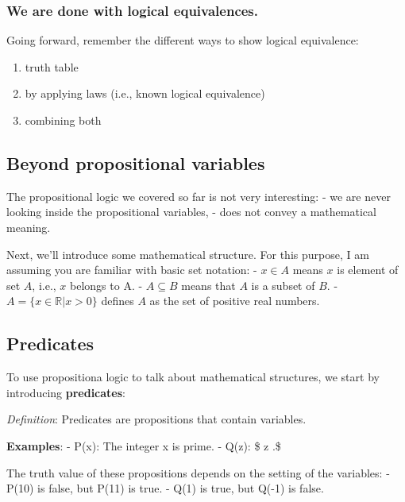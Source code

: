 \documentclass[11pt]{article}
\providecommand{\tightlist}{%
      \setlength{\itemsep}{0pt}\setlength{\parskip}{0pt}}
\begin{document}
    \subsubsection{We are done with logical
equivalences.}\label{we-are-done-with-logical-equivalences.}

Going forward, remember the different ways to show logical equivalence:

\begin{enumerate}
\def\labelenumi{\alph{enumi}.}
\tightlist
\item
  truth table\\
\item
  by applying laws (i.e., known logical equivalence)\\
\item
  combining both
\end{enumerate}

    \subsection{Beyond propositional
variables}\label{beyond-propositional-variables}

The propositional logic we covered so far is not very interesting: - we
are never looking inside the propositional variables, - does not convey
a mathematical meaning.

Next, we'll introduce some mathematical structure. For this purpose, I
am assuming you are familiar with basic set notation: - \(x \in A\)
means \(x\) is element of set \(A\), i.e., \(x\) belongs to A. -
\(A \subseteq B\) means that \(A\) is a subset of \(B.\) -
\(A = \{ x \in \mathbb{R} | x > 0\}\) defines \(A\) as the set of
positive real numbers.

    \subsection{Predicates}\label{predicates}

To use propositiona logic to talk about mathematical structures, we
start by introducing \textbf{predicates}:

\emph{Definition}: Predicates are propositions that contain variables.

\textbf{Examples}: - P(x): The integer x is prime. - Q(z): \$ z
.\$

    The truth value of these propositions depends on the setting of the
variables: - P(10) is false, but P(11) is true. - Q(1) is true, but
Q(-1) is false.
\end{document}
